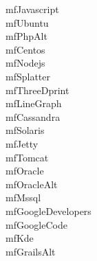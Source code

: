 \documentclass[parskip=half, twocolumn, 13pt]{scrartcl}
\begin{document}
\mfJavascript{} \quad mfJavascript \\
\mfUbuntu{} \quad mfUbuntu \\
\mfPhpAlt{} \quad mfPhpAlt \\
\mfCentos{} \quad mfCentos \\
\mfNodejs{} \quad mfNodejs \\
\mfSplatter{} \quad mfSplatter \\
\mfThreeDprint{} \quad mfThreeDprint \\
\mfLineGraph{} \quad mfLineGraph \\
\mfCassandra{} \quad mfCassandra \\
\mfSolaris{} \quad mfSolaris \\
\mfJetty{} \quad mfJetty \\
\mfTomcat{} \quad mfTomcat \\
\mfOracle{} \quad mfOracle \\
\mfOracleAlt{} \quad mfOracleAlt \\
\mfMssql{} \quad mfMssql \\
\mfGoogleDevelopers{} \quad mfGoogleDevelopers \\
\mfGoogleCode{} \quad mfGoogleCode \\
\mfKde{} \quad mfKde \\
\mfGrailsAlt{} \quad mfGrailsAlt \\
\end{document}

